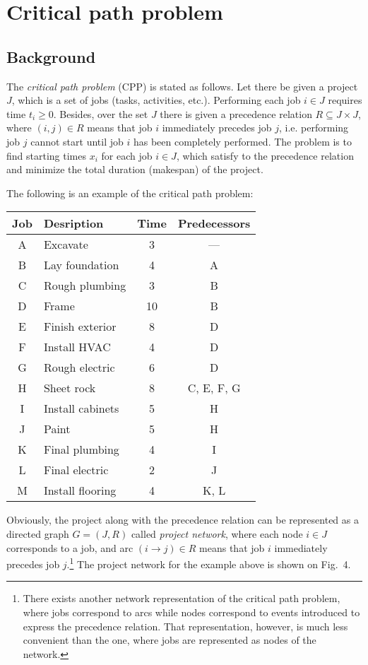 \documentclass[11pt]{report}
\begin{document}
\newpage

\section{Critical path problem}

\subsection{Background}

The {\it critical path problem} (CPP) is stated as follows. Let there
be given a project $J$, which is a set of jobs (tasks, activities,
etc.). Performing each job $i\in J$ requires time $t_i\geq 0$. Besides,
over the set $J$ there is given a precedence relation
$R\subseteq J\times J$, where $(i,j)\in R$ means that job $i$
immediately precedes job $j$, i.e. performing job $j$ cannot start
until job $i$ has been completely performed. The problem is to find
starting times $x_i$ for each job $i\in J$, which satisfy to the
precedence relation and minimize the total duration (makespan) of the
project.

The following is an example of the critical path problem:

\bigskip

\begin{center}
\begin{tabular}{|c|l|c|c|}
\hline
Job&Desription&Time&Predecessors\\
\hline
A&Excavate&3&---\\
B&Lay foundation&4&A\\
C&Rough plumbing&3&B\\
D&Frame&10&B\\
E&Finish exterior&8&D\\
F&Install HVAC&4&D\\
G&Rough electric&6&D\\
H&Sheet rock&8&C, E, F, G\\
I&Install cabinets&5&H\\
J&Paint&5&H\\
K&Final plumbing&4&I\\
L&Final electric&2&J\\
M&Install flooring&4&K, L\\
\hline
\end{tabular}
\end{center}

\bigskip

Obviously, the project along with the precedence relation can be
represented as a directed graph $G=(J,R)$ called {\it project network},
where each node $i\in J$ corresponds to a job, and arc
$(i\rightarrow j)\in R$ means that job $i$ immediately precedes job
$j$.\footnote{There exists another network representation of the
critical path problem, where jobs correspond to arcs while nodes
correspond to events introduced to express the precedence relation.
That representation, however, is much less convenient than the one,
where jobs are represented as nodes of the network.} The project network
for the example above is shown on Fig.~4.
\end{document}
